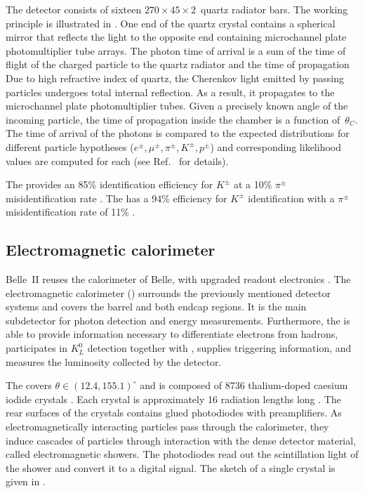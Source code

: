 The \TOP detector \cite{Fast:2017pff} consists of sixteen $270 \times 45 \times 2$~\cm quartz radiator bars.
The working principle is illustrated in .
One end of the quartz crystal contains a spherical mirror that reflects the light to the opposite end containing microchannel plate photomultiplier tube arrays.
The photon time of arrival is a sum of the time of flight of
the charged particle to the quartz radiator and the time of propagation
Due to high refractive index of quartz, the Cherenkov light emitted by passing particles undergoes total internal reflection.
As a result, it propagates to the microchannel plate photomultiplier tubes. 
Given a precisely known angle of the incoming particle, the time of propagation inside the chamber is a function of~$\theta_C$.
The time of arrival of the photons is compared to the expected distributions for different particle hypotheses ($e^{\pm},\mu^{\pm},\pi^{\pm},K^{\pm},p^{\pm}$) and corresponding likelihood values are computed for each (see Ref.~\cite{Yonenaga:2020eby} for details).

The \TOP provides an 85\% identification efficiency for $K^{\pm}$ at a 10\% $\pi^{\pm}$ misidentification rate \cite{Kojima:2022qcl}.
The \ARICH has a 94\% efficiency for $K^{\pm}$ identification with a $\pi^{\pm}$ misidentification rate of 11\% \cite{Yonenaga:2020eby}.

\subsection{Electromagnetic calorimeter}\label{sec:ecl}

Belle~II reuses the calorimeter of Belle, with upgraded readout electronics \cite{Belle-II:2010dht}.
The electromagnetic calorimeter (\ECL) surrounds the previously mentioned detector systems and covers the barrel and both endcap regions.
It is the main subdetector for photon detection and energy measurements.
Furthermore, the \ECL is able to provide information necessary to differentiate electrons from hadrons, participates in $K_L^0$ detection together with \KLM,
supplies triggering information, and measures the luminosity collected by the detector.

The \ECL covers $\theta\in(12.4,155.1)^{\circ}$ and is composed of 8736 thalium-doped caesium iodide crystals \cite{Miyabayashi:2020xzp}.
Each crystal is approximately 16 radiation lengths long \cite{Aulchenko:2015nvy}.
The rear surfaces of the crystals contains glued photodiodes with preamplifiers.
As electromagnetically interacting particles pass through the calorimeter, they induce cascades of particles through interaction with the dense detector material, called electromagnetic showers.
The photodiodes read out the scintillation light of the shower and convert it to a digital signal.
The sketch of a single \ECL crystal is given in .

